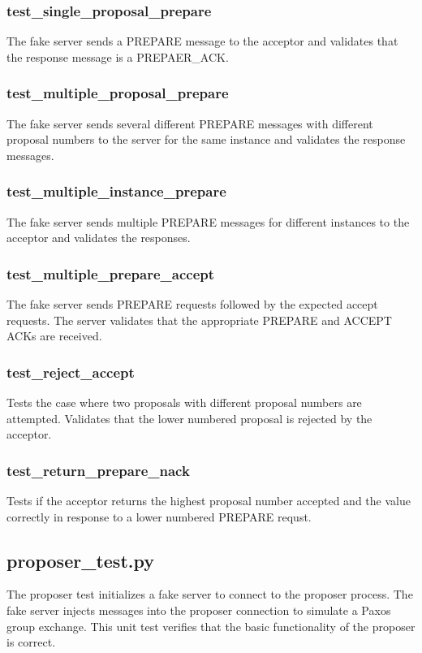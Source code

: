 \documentclass{article}
\begin{document}
\subsubsection{test\_single\_proposal\_prepare}
The fake server sends a PREPARE message to the acceptor and validates that the response message is a PREPAER\_ACK.

\subsubsection{test\_multiple\_proposal\_prepare}
The fake server sends several different PREPARE messages with different proposal numbers to the server for the same instance and validates the response messages.

\subsubsection{test\_multiple\_instance\_prepare}
The fake server sends multiple PREPARE messages for different instances to the acceptor and validates the responses.

\subsubsection{test\_multiple\_prepare\_accept}
The fake server sends PREPARE requests followed by the expected accept requests.
The server validates that the appropriate PREPARE and ACCEPT ACKs are received.

\subsubsection{test\_reject\_accept}
Tests the case where two proposals with different proposal numbers are attempted.
Validates that the lower numbered proposal is rejected by the acceptor.

\subsubsection{test\_return\_prepare\_nack}
Tests if the acceptor returns the highest proposal number accepted and the value correctly in response to a lower numbered PREPARE requst.

\subsection{proposer\_test.py}

The proposer test initializes a fake server to connect to the proposer process.
The fake server injects messages into the proposer connection to simulate a Paxos group exchange.
This unit test verifies that the basic functionality of the proposer is correct.
\end{document}
